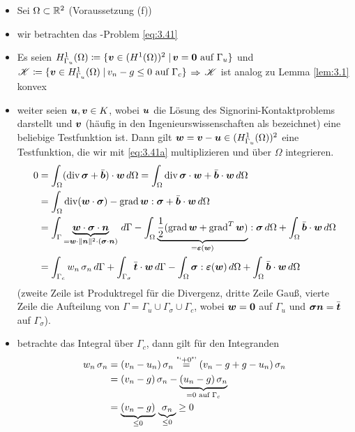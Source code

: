 \begin{itemize}
\item Sei $\Omega \subset \mathbb{R}^2$ (Voraussetzung (f))

\item wir betrachten das -Problem \eqref{eq:3.41}

\item Es seien
$H^1_{\Gamma_u}(\Omega) \coloneqq \{\boldsymbol v \in (H^1(\Omega))^2 \;\vert\, \boldsymbol v = \boldsymbol 0 \text{ auf } \Gamma_u\}$ und
$\mathscr K \coloneqq \{\boldsymbol v \in H^1_{\Gamma_u}(\Omega) \;\vert\, v_n - g \le 0 \text{ auf } \Gamma_c\}$ $\Rightarrow$ $\mathscr K$ ist analog zu Lemma \ref{lem:3.1} konvex

\item weiter seien $\boldsymbol u, \boldsymbol v \in K$, wobei $\boldsymbol u$ die Lösung des Signorini-Kontaktproblems darstellt und $\boldsymbol v$ (häufig in den Ingenieurswissenschaften als \textit{} bezeichnet) eine beliebige Testfunktion ist. Dann gilt $\boldsymbol w = \boldsymbol v - \boldsymbol u \in (H^1_{\Gamma_u}(\Omega))^2$ eine Testfunktion, die wir mit \eqref{eq:3.41a} multiplizieren und über $\Omega$ integrieren.
\begin{align}\notag
	 0 & =  \int_\Omega (\operatorname{div} \boldsymbol\sigma + \bar{\boldsymbol b}) \cdot \boldsymbol w \, d \Omega = \int_\Omega \operatorname{div} \boldsymbol \sigma \cdot \boldsymbol w + \bar{\boldsymbol b} \cdot \boldsymbol w \, d\Omega \\
	 \notag
	& = \int_\Omega \operatorname{div}(\boldsymbol w \cdot \boldsymbol\sigma) - \operatorname{grad} \boldsymbol w : \boldsymbol \sigma + \bar{\boldsymbol b} \cdot \boldsymbol w \, d\Omega \\
	\notag
	& = \int_\Gamma \underbrace{\boldsymbol w \cdot \boldsymbol \sigma \cdot \boldsymbol n}_{=\boldsymbol w \cdot \lVert \boldsymbol n\rVert^2 \cdot (\boldsymbol \sigma \cdot \boldsymbol n)} \, d\Gamma - \int_\Omega \underbrace{\frac 1 2 (\operatorname{grad} \boldsymbol w + \operatorname{grad}^T \boldsymbol w)}_{= \boldsymbol {\varepsilon} (\boldsymbol w)} : \boldsymbol \sigma \, d\Omega + \int_\Omega \bar{\boldsymbol b} \cdot \boldsymbol w \, d \Omega \\
	\label{eq:3.43}
	& = \int_{\Gamma_c} w_n \, \sigma_n \, d \Gamma + \int_{\Gamma_\sigma} \bar{\boldsymbol t} \cdot \boldsymbol w \, d\Gamma-\int_\Omega \boldsymbol\sigma: \boldsymbol {\varepsilon}(\boldsymbol w) \, d\Omega + \int_\Omega \bar{\boldsymbol b} \cdot \boldsymbol w \, d\Omega
\end{align}
(zweite Zeile ist Produktregel für die Divergenz, dritte Zeile Gauß, vierte Zeile die Aufteilung von $\Gamma = \Gamma_u \cup \Gamma_\sigma \cup \Gamma_c$, wobei $\boldsymbol w = \boldsymbol 0$ auf $\Gamma_u$ und $\boldsymbol \sigma \boldsymbol n = \bar{\boldsymbol t}$ auf $\Gamma_\sigma$).

\item betrachte das Integral über $\Gamma_c$, dann gilt für den Integranden
\begin{align*}
	w_n \, \sigma_n &= (v_n - u_n) \, \sigma_n \stackrel{\scriptsize\text{"`}+0\text{"'}}= (v_n-g+g-u_n) \, \sigma_n  \\
	& =(v_n - g) \, \sigma_n - \underbrace{(u_n-g) \, \sigma_n}_{=0 \text{ auf } \Gamma_c} \\
	&  =\underbrace{ (v_n-g)}_{\le 0} \, \underbrace{\sigma_n}_{\le 0} \ge 0
\end{align*}


\end{itemize}
